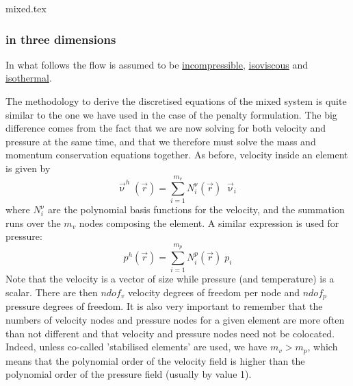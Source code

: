\begin{flushright} {\tiny {\color{gray} mixed.tex}} \end{flushright}

\subsubsection{in three dimensions}

In what follows the flow is assumed to be \underline{incompressible}, 
\underline{isoviscous} and \underline{isothermal}. 

The methodology to derive the discretised equations of the mixed system is 
quite similar to the one we have used in the case of the penalty formulation.
The big difference comes from the fact that we are now solving for both 
velocity and pressure at the same time, and that we therefore must solve 
the mass and momentum conservation equations together.
As before, velocity inside an element is given by 
\begin{equation}
{\vec \upnu}^h({\vec r})=\sum_{i=1}^{m_v} N_i^\upnu({\vec r})\;  {\vec \upnu}_i
\label{mixed01}
\end{equation}
where $N_i^{\upnu}$ are the polynomial basis functions for the velocity,
and the summation runs over the $m_v$ nodes composing the element.
A similar expression is used for pressure:
\begin{equation}
p^h({\vec r})=\sum_{i=1}^{m_p} N_i^p({\vec r}) \; p_i
\label{mixed02}
\end{equation}
Note that the velocity is a vector of size while pressure (and temperature)
is a scalar. There are then $ndof_v$ velocity degrees of freedom per node
and $ndof_p$ pressure degrees of freedom.
It is also very important to remember that the numbers of 
velocity nodes and pressure nodes for a given element 
are more often than not different and that velocity and pressure
nodes need not be colocated. Indeed, unless 
co-called 'stabilised elements' are used, we have $m_v>m_p$, which 
means that the polynomial order of the velocity field is higher than 
the polynomial order of the pressure field (usually by value 1).


